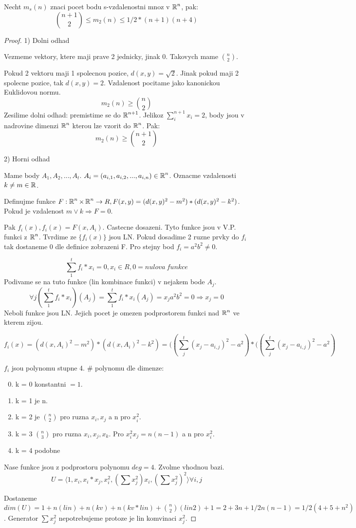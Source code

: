 \begin{theorem}
Necht $m_s(n)$ znaci pocet bodu s-vzdalenostni mnoz v $\operatorname{\mathbb{R}}^n$, pak:
\[ \binom{n+1}{2} \leq m_2(n) \leq 1/2 * (n+1)(n+4) \]
\end{theorem}
\begin{proof}
	1) Dolni odhad

	Vezmeme vektory, ktere maji prave 2 jednicky, jinak 0. Takovych mame $\binom{n}{2}$.

	Pokud 2 vektoru maji 1 spolecnou pozice, $d(x,y) = \sqrt{2}$. Jinak pokud maji 2 spolecne pozice, tak $d(x,y) = 2$. Vzdalenost pocitame jako kanonickou Euklidovou normu.
	\[ m_2(n) \geq \binom{n}{2} \]
	Zesilime dolni odhad: premistime se do $\operatorname{\mathbb{R}}^{n+1}$. Jelikoz $ \sum_i^{n+1} x_i = 2 $, body jsou v nadrovine dimenzi $\operatorname{\mathbb{R}}^n$ kterou lze vzorit do $\operatorname{\mathbb{R}}^n$. Pak:
	\[ m_2(n) \geq \binom{n + 1}{2} \]

	2) Horni odhad

	Mame body $A_1, A_2, ..., A_t$. $A_i = (a_{i,1}, a_{i,2}, ..., a_{i,n}) \in \operatorname{\mathbb{R}}^n$. Oznacme vzdalenosti $k \ne m \in \operatorname{\mathbb{R}}$.

	Definujme funkce $F : \operatorname{\mathbb{R}}^n \times \operatorname{\mathbb{R}}^n \to R, F(x,y) = (d(x,y)^2 - m^2) * (d(x,y)^2 - k^2)$. Pokud je vzdalenost $m \lor k \Rightarrow F = 0$.

	Pak $f_i(x), f_i(x) = F(x, A_i).$ Castecne dosazeni. Tyto funkce jsou v V.P. funkci z $\operatorname{\mathbb{R}}^n$. Tvrdime ze $\{ f_i(x)\}$ jsou LN.
	Pokud dosadime 2 ruzne prvky do $f_i$ tak dostaneme 0 dle definice zobrazeni F. Pro stejny bod $f_i = a^2b^2 \ne 0$.

	\[ \sum_1^t f_i * x_i = 0, x_i \in R, 0 = nulova \ funkce \]
	Podivame se na tuto funkce (lin kombinace funkci) v nejakem bode $A_j$.
	\[ \forall j (\sum_1^t f_i * x_i)(A_j) = \sum_1^t f_i * x_i(A_j) = x_j a^2 b^2 = 0 \Rightarrow x_j = 0 \]
	Neboli funkce jsou LN. Jejich pocet je omezen podprostorem funkci nad $\operatorname{\mathbb{R}}^n$ ve kterem zijou.

	\[ f_i(x) = (d(x,A_i)^2 - m^2) * (d(x,A_i)^2 - k^2) = ((\sum_j^t(x_j - a_{i,j})^2 - a^2)*((\sum_j^t(x_j - a_{i,j})^2 - a^2)\]

	$f_i$ jsou polynomu stupne 4. \# polynomu dle dimenze:
	\begin{enumerate}
		\setcounter{enumii}{-1}
		\item k = 0 konstantni $ = 1$.
		\item k = 1 je n.
		\item k = 2 je $\binom{n}{2}$ pro ruzna $x_i, x_j$ a n pro $x_i^2$.
		\item k = 3 $\binom{n}{3}$ pro ruzna $x_i, x_j, x_k$. Pro $x_i^2x_j = n(n-1)$ a n pro $x_i^2$.
		\item k = 4 podobne
	\end{enumerate}
	Nase funkce jsou z podprostoru polynomu $deg = 4$. Zvolme vhodnou bazi.
	\[ U = \langle 1, x_i, x_i*x_j, x_i^2, (\sum x_j^2)x_i, (\sum x_j^2)^2 \rangle \forall i,j \]

	Dostaneme $dim(U) = 1 + n (lin) + n (kv) + n (kv * lin) + \binom{n}{2} (lin 2) + 1 = 2 + 3n + 1/2 n (n-1) = 1/2 (4 + 5 + n^2)$. Generator $\sum x_j^2$ nepotrebujeme protoze je lin komvinaci $x_j^2$.

\end{proof}
